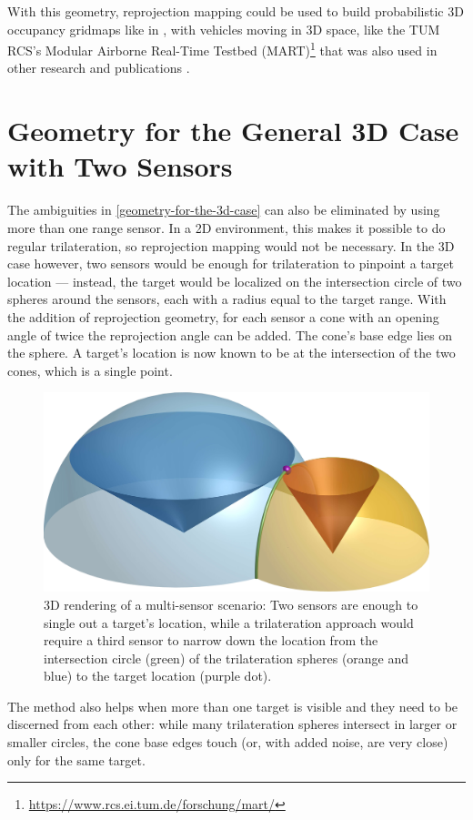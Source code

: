 With this geometry, reprojection mapping could be used to build probabilistic 3D occupancy gridmaps like in \cite{Hornung2013}, with vehicles moving in 3D space, like the TUM RCS's Modular Airborne Real-Time Testbed (MART)\footnote{\url{https://www.rcs.ei.tum.de/forschung/mart/}} that was also used in other research and publications \cite{Becker2015}.

\section{Geometry for the General 3D Case with Two Sensors} \label{multisensor}
The ambiguities in \cref{geometry-for-the-3d-case} can also be eliminated by using more than one range sensor. In a 2D environment, this makes it possible to do regular trilateration, so reprojection mapping would not be necessary. In the 3D case however, two sensors would be enough for trilateration to pinpoint a target location --- instead, the target would be localized on the intersection circle of two spheres around the sensors, each with a radius equal to the target range. With the addition of reprojection geometry, for each sensor a cone with an opening angle of twice the reprojection angle can be added. The cone's base edge lies on the sphere. A target's location is now known to be at the intersection of the two cones, which is a single point.

\begin{figure}
    \centering
    \includegraphics[max width=.75\textwidth]{gfx/diagrams/multisensor}
    \caption{3D rendering of a multi-sensor scenario: Two sensors are enough to
    single out a target's location, while a trilateration approach would require
    a third sensor to narrow down the location from the intersection circle
    (green) of the trilateration spheres (orange and blue) to the target location (purple dot).}
    \label{fig:multisensor}
\end{figure}

The method also helps when more than one target is visible and they need to be discerned from each other: while many trilateration spheres intersect in larger or smaller circles, the cone base edges touch (or, with added noise, are very close) only for the same target.

